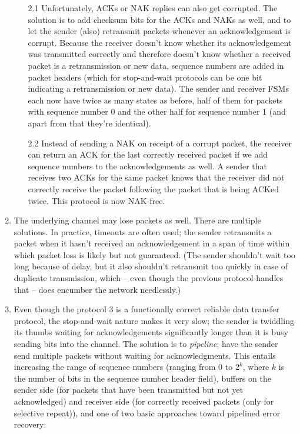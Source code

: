 \documentclass[8pt, table, xcdraw]{article}%
\begin{document}
\begin{enumerate}
    \begin{enumerate}
        \item[2.1] Unfortunately, ACKs or NAK replies can also get corrupted. The solution is to add checksum bits for the ACKs and NAKs as well, and to let the sender (also) retransmit packets whenever an acknowledgement is corrupt. Because the receiver doesn't know whether its acknowledgement was transmitted correctly and therefore doesn't know whether a received packet is a retransmission or new data, sequence numbers are added in packet headers (which for stop-and-wait protocols can be one bit indicating a retransmission or new data). The sender and receiver FSMs each now have twice as many states as before, half of them for packets with sequence number 0 and the other half for sequence number 1 (and apart from that they're identical).
        \item[2.2] Instead of sending a NAK on receipt of a corrupt packet, the receiver can return an ACK for the last correctly received packet if we add sequence numbers to the acknowledgements as well. A sender that receives two ACKs for the same packet knows that the receiver did not correctly receive the packet following the packet that is being ACKed twice. This protocol is now NAK-free.
    \end{enumerate}
    
    \item The underlying channel may lose packets as well. There are multiple solutions. In practice, timeouts are often used; the sender retransmits a packet when it hasn't received an acknowledgement in a span of time within which packet loss is likely but not guaranteed. (The sender shouldn't wait too long because of delay, but it also shouldn't retransmit too quickly in case of duplicate transmission, which -- even though the previous protocol handles that -- does encumber the network needlessly.)
    \item Even though the protocol 3 is a functionally correct reliable data transfer protocol, the stop-and-wait nature makes it very slow; the sender is twiddling its thumbs waiting for acknowledgements significantly longer than it is busy sending bits into the channel. The solution is to \emph{pipeline}; have the sender send multiple packets without waiting for acknowledgments. This entails increasing the range of sequence numbers (ranging from $0$ to $2^k$, where $k$ is the number of bits in the sequence number header field), buffers on the sender side (for packets that have been transmitted but not yet acknowledged) and receiver side (for correctly received packets (only for selective repeat)), and one of two basic approaches toward pipelined error recovery:


\end{enumerate}
\end{document}
